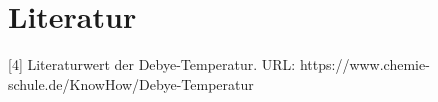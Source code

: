 \section{Literatur}



[4] \; Literaturwert der Debye-Temperatur. {URL: https://www.chemie-schule.de/KnowHow/Debye-Temperatur}
